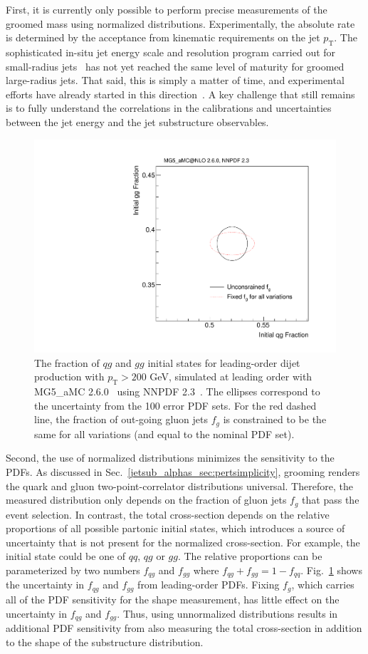 \documentclass[11pt]{cernrep}
\begin{document}
First, it is currently only possible to perform precise measurements of the groomed mass using normalized distributions.
%
Experimentally, the absolute rate is determined by the acceptance from kinematic requirements on the jet $p_\mathrm{T}$.
%
The sophisticated in-situ jet energy scale and resolution program carried out for small-radius jets~\cite{Aad:2014bia,Aaboud:2017jcu,Khachatryan:2016kdb,CMS-DP-2016-020} has not yet reached the same level of maturity for groomed large-radius jets.
%
That said, this is simply a matter of time, and experimental efforts have already started in this direction~\cite{ATLAS-CONF-2017-063}.
%
A key challenge that still remains is to fully understand the correlations in the calibrations and uncertainties between the jet energy and the jet substructure observables.

\begin{figure}[t]
\begin{center}
\includegraphics[width = 0.5\columnwidth]{jetsub_alphas_PDFs.pdf}
\end{center}
\caption{The fraction of $qg$ and $gg$ initial states for leading-order dijet production with $p_\mathrm{T}>200$ GeV, simulated at leading order with MG5\_aMC 2.6.0~\cite{Alwall:2014hca} using NNPDF 2.3~\cite{Ball:2012cx}.  The ellipses correspond to the uncertainty from the 100 error PDF sets.  For the red dashed line, the fraction of out-going gluon jets $f_g$ is constrained to be the same for all variations (and equal to the nominal PDF set).}
\label{jetsub_alphas_fig:pdf}
\end{figure}

Second, the use of normalized distributions minimizes the sensitivity to the PDFs.
%
As discussed in Sec.~\ref{jetsub_alphas_sec:pertsimplicity}, grooming renders the quark and gluon two-point-correlator distributions universal.
%
Therefore, the measured distribution only depends on the fraction of gluon jets $f_g$ that pass the event selection.
%
In contrast, the total cross-section depends on the relative proportions of all possible partonic initial states, which introduces a source of uncertainty that is not present for the normalized cross-section.
%
For example, the initial state could be one of $qq$, $qg$ or $gg$.
%
The relative proportions can be parameterized by two numbers $f_{qg}$ and $f_{gg}$ where $f_{qg}+f_{gg}=1-f_{qq}$.
%
Fig.~\ref{jetsub_alphas_fig:pdf} shows the uncertainty in $f_{qg}$ and $f_{gg}$ from leading-order PDFs.
%
Fixing $f_g$, which carries all of the PDF sensitivity for the shape measurement, has little effect on the uncertainty in $f_{qg}$ and $f_{gg}$.
%
Thus, using unnormalized distributions results in additional PDF sensitivity from also measuring the total cross-section in addition to the shape of the substructure distribution. 
\end{document}
